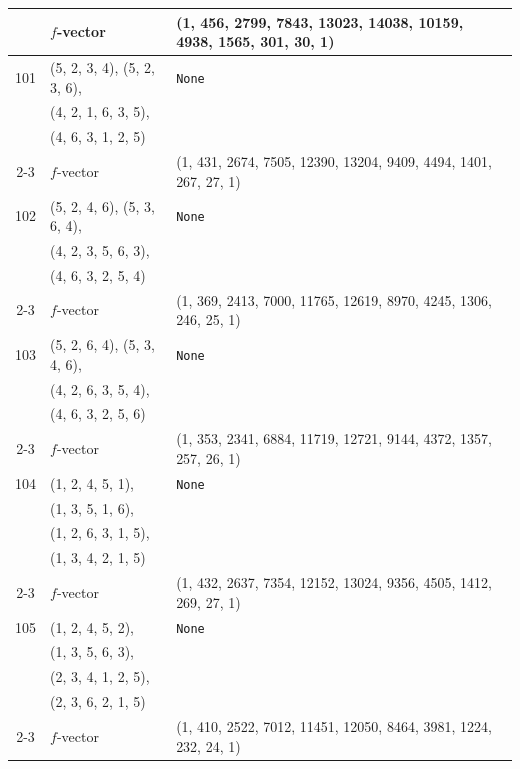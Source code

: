 \documentclass[10pt]{amsart}
\numberwithin{equation}{section}
\theoremstyle{plain}
\theoremstyle{definition}
\theoremstyle{remark}
\begin{document}
{\begin{longtable}{c|l|l}
		& $f$-vector & {(1, 456, 2799, 7843, 13023, 14038, 10159, 4938, 1565, 301, 30, 1)} \\
		\midrule
		
		101 & (5, 2, 3, 4), (5, 2, 3, 6), & \texttt{None} \\
		& (4, 2, 1, 6, 3, 5), &  \\
		& (4, 6, 3, 1, 2, 5) &  \\ \cline{2-3}
		
		& $f$-vector & {(1, 431, 2674, 7505, 12390, 13204, 9409, 4494, 1401, 267, 27, 1)} \\
		\midrule
		
		102 & (5, 2, 4, 6), (5, 3, 6, 4), & \texttt{None} \\
		& (4, 2, 3, 5, 6, 3), &  \\
		& (4, 6, 3, 2, 5, 4) &  \\ \cline{2-3}
		
		& $f$-vector & {(1, 369, 2413, 7000, 11765, 12619, 8970, 4245, 1306, 246, 25, 1)} \\
		\midrule
		
		103 & (5, 2, 6, 4), (5, 3, 4, 6), & \texttt{None} \\
		& (4, 2, 6, 3, 5, 4), &  \\
		& (4, 6, 3, 2, 5, 6) &  \\ \cline{2-3}
		
		& $f$-vector & {(1, 353, 2341, 6884, 11719, 12721, 9144, 4372, 1357, 257, 26, 1)} \\
		\midrule
		
		104 & (1, 2, 4, 5, 1), & \texttt{None} \\
		& (1, 3, 5, 1, 6), &  \\
		& (1, 2, 6, 3, 1, 5), &  \\
		& (1, 3, 4, 2, 1, 5) &  \\ \cline{2-3}
		
		& $f$-vector & {(1, 432, 2637, 7354, 12152, 13024, 9356, 4505, 1412, 269, 27, 1)} \\
		\midrule
		
		105 & (1, 2, 4, 5, 2), & \texttt{None} \\
		& (1, 3, 5, 6, 3), &  \\
		& (2, 3, 4, 1, 2, 5), &  \\
		& (2, 3, 6, 2, 1, 5) &  \\ \cline{2-3}
		
		& $f$-vector & {(1, 410, 2522, 7012, 11451, 12050, 8464, 3981, 1224, 232, 24, 1)} \\
		\midrule
		

\end{longtable}}
\end{document}
